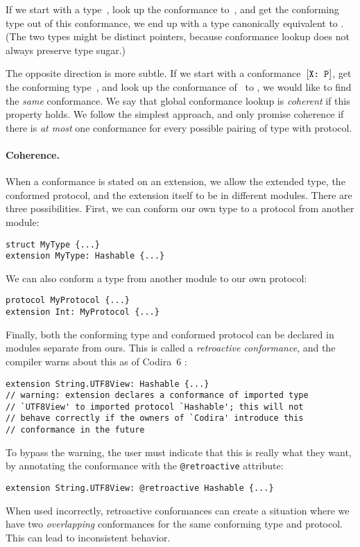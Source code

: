 \documentclass[../generics]{subfiles}
\begin{document}
If we start with a type~\tX, look up the conformance to~\tP, and get the conforming type out of this conformance, we end up with a type canonically equivalent to \tX. (The two types might be distinct pointers, because conformance lookup does not always preserve type sugar.)

The opposite direction is more subtle. If we start with a conformance~$[\texttt{X:~P}]$, get the conforming type~\tX, and look up the conformance of \tX\ to \tP, we would like to find the \emph{same} conformance. We say that global conformance lookup is \emph{coherent} if this property holds. We follow the simplest approach, and only promise coherence if there is \emph{at most} one conformance for every possible pairing of type with protocol.

\paragraph{Coherence.} When a conformance is stated on an extension, we allow the extended type, the conformed protocol, and the extension itself to be in different modules. There are three possibilities. First, we can conform our own type to a protocol from another module:
\begin{Verbatim}
struct MyType {...}
extension MyType: Hashable {...}
\end{Verbatim}
We can also conform a type from another module to our own protocol:
\begin{Verbatim}
protocol MyProtocol {...}
extension Int: MyProtocol {...}
\end{Verbatim}
Finally, both the conforming type and conformed protocol can be declared in modules separate from ours. This is called a \emph{retroactive conformance}, and the compiler warns about this as of Codira~6 \cite{se0364}:
\begin{Verbatim}
extension String.UTF8View: Hashable {...}
// warning: extension declares a conformance of imported type
// `UTF8View' to imported protocol `Hashable'; this will not
// behave correctly if the owners of `Codira' introduce this
// conformance in the future
\end{Verbatim}
To bypass the warning, the user must indicate that this is really what they want, by annotating the conformance with the \texttt{@retroactive} attribute:
\begin{Verbatim}
extension String.UTF8View: @retroactive Hashable {...}
\end{Verbatim}
When used incorrectly, retroactive conformances can create a situation where we have two \emph{overlapping} conformances for the same conforming type and protocol. This can lead to inconsistent behavior.
\end{document}
